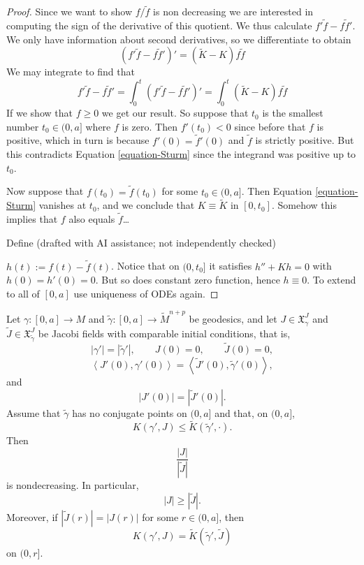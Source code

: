 \begin{proof}
Since we want to show $f/\tilde{f}$ is non
decreasing we are interested in
computing the sign of the derivative of this
quotient. We thus calculate
$f'\tilde{f}-f \tilde{f}'$. We only have
information about second derivatives,
so we differentiate to obtain
$$
(f'\tilde{f}-f
\tilde{f}')'=(\tilde{K}-K)f\tilde{f}
$$
We may integrate to find that
\begin{equation}
\label{equation-Sturm}
f'\tilde{f}-f \tilde{f}'=\int_0^t
(f'\tilde{f}-f \tilde{f}')'
=\int_0^t (\tilde{K}-K)f\tilde{f}
\end{equation}
If we show that $f\geq 0$ we get our result.
So suppose that $t_0$ is the
smallest number $t_0 \in (0,a]$ where $f$ is
zero. Then $f'(t_0)<0$ since before
that $f$ is positive, which in turn is
because $f'(0)=\tilde{f}'(0)$ and
$\tilde{f}$ is strictly positive. But this
contradicts Equation
\ref{equation-Sturm} since the integrand was
positive up to $t_0$.

Now suppose that $f(t_0)=\tilde{f}(t_0)$ for
some $t_0 \in (0,a]$. Then Equation
\ref{equation-Sturm} vanishes at $t_0$, and
we conclude that $K \equiv
\tilde{K}$ in $[0,t_0]$. Somehow this implies
that $f$ also equals $\tilde{f}$…

Define
(drafted with AI assistance; not independently checked)

$h(t):=f(t)-\tilde{f}(t)$. Notice that on
$(0,t_0]$ it satisfies $h''+Kh=0$ with
$h(0)=h'(0)=0$. But so does constant zero
function, hence  $h\equiv0$. To extend to all
of $[0,a]$ use uniqueness of
ODEs again.
\end{proof}

\begin{theorem}[Rauch]
\label{theorem-rauch-comparison}
Let $\gamma:[0,a]\to M$ and
$\tilde{\gamma}:[0,a]\to \tilde M^{n+p}$
be geodesics, and let
$J\in\mathfrak{X}^J_\gamma$ and
$\tilde J\in\mathfrak{X}^J_{\tilde\gamma}$
be Jacobi fields with comparable initial
conditions, that is,
$$
|\gamma'|=|\tilde\gamma'|,
\qquad
J(0)=0,\qquad \tilde J(0)=0,
$$
$$
\left\langle{}J'(0),\gamma'(0)\right\rangle{}
=
\left\langle{}\tilde J'(0),
\tilde\gamma'(0)\right\rangle{},
$$
and
$$
|J'(0)|=|\tilde J'(0)|.
$$
Assume that $\tilde\gamma$ has no conjugate
points on $(0,a]$ and that, on $(0,a]$,
$$
K(\gamma',J)
\leq
\tilde K(\tilde\gamma',\cdot).
$$
Then
$$
\frac{|J|}{|\tilde J|}
$$
is nondecreasing. In particular,
$$
|J|\geq |\tilde J|.
$$
Moreover, if $|\tilde J(r)|=|J(r)|$ for
some $r\in(0,a]$, then
$$
K(\gamma',J)=\tilde K(\tilde\gamma',
\tilde J)
$$
on $(0,r]$.
\end{theorem}

